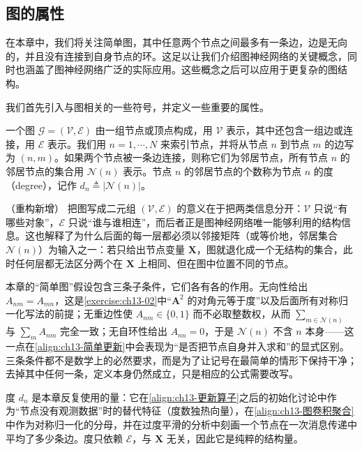 \documentclass[../../main.tex]{subfiles}
\begin{document}
\subsection{图的属性}\label{subsection:ch13-图的属性}

在本章中，我们将关注简单图，其中任意两个节点之间最多有一条边，边是无向的，并且没有连接到自身节点的环。这足以让我们介绍图神经网络的关键概念，同时也涵盖了图神经网络广泛的实际应用。这些概念之后可以应用于更复杂的图结构。

我们首先引入与图相关的一些符号，并定义一些重要的属性。

\begin{definition}[图、邻居与度]\label{definition:ch13-图}
一个图 $\mathcal{G}=(\mathcal{V},\mathcal{E})$ 由一组节点或顶点构成，用 $\mathcal{V}$ 表示，其中还包含一组边或连接，用 $\mathcal{E}$ 表示。我们用 $n=1,\cdots,N$ 来索引节点，并将从节点 $n$ 到节点 $m$ 的边写为 $(n,m)$。如果两个节点被一条边连接，则称它们为邻居节点，所有节点 $n$ 的邻居节点的集合用 $\mathcal{N}(n)$ 表示。节点 $n$ 的邻居节点的个数称为节点 $n$ 的度（degree），记作 $d_n\triangleq|\mathcal{N}(n)|$。
\end{definition}

\begin{remark}（重构新增）
把图写成二元组 $(\mathcal{V},\mathcal{E})$ 的意义在于把两类信息分开：$\mathcal{V}$ 只说“有哪些对象”，$\mathcal{E}$ 只说“谁与谁相连”，而后者正是图神经网络唯一能够利用的结构信息。这也解释了为什么后面的每一层都必须以邻接矩阵（或等价地，邻居集合 $\mathcal{N}(n)$）为输入之一：若只给出节点变量 $\bm{X}$，图就退化成一个无结构的集合，此时任何层都无法区分两个在 $\bm{X}$ 上相同、但在图中位置不同的节点。\par
本章的“简单图”假设包含三条子条件，它们各有各的作用。无向性给出 $A_{nm}=A_{mn}$，这是\cref{exercise:ch13-02}中“$\bm{A}^2$ 的对角元等于度”以及后面所有对称归一化写法的前提；无重边性使 $A_{nm}\in\{0,1\}$ 而不必取整数权，从而 $\sum_{m\in\mathcal{N}(n)}$ 与 $\sum_{m}A_{nm}$ 完全一致；无自环性给出 $A_{nn}=0$，于是 $\mathcal{N}(n)$ 不含 $n$ 本身——这一点在\eqref{align:ch13-简单更新}中会表现为“是否把节点自身并入求和”的显式区别。三条条件都不是数学上的必然要求，而是为了让记号在最简单的情形下保持干净；去掉其中任何一条，定义本身仍然成立，只是相应的公式需要改写。\par
度 $d_n$ 是本章反复使用的量：它在\eqref{align:ch13-更新算子}之后的初始化讨论中作为“节点没有观测数据”时的替代特征（度数独热向量），在\eqref{align:ch13-图卷积聚合}中作为对称归一化的分母，并在过度平滑的分析中刻画一个节点在一次消息传递中平均了多少条边。度只依赖 $\mathcal{E}$，与 $\bm{X}$ 无关，因此它是纯粹的结构量。
\end{remark}
\end{document}
